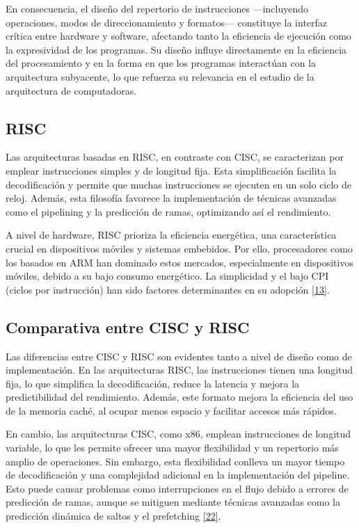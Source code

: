 \documentclass[12pt,oneside]{templates/unerthesis}
\begin{document}
En consecuencia, el diseño del repertorio de instrucciones ---incluyendo operaciones, modos de direccionamiento y formatos--- constituye la interfaz crítica entre hardware y software, afectando tanto la eficiencia de ejecución como la expresividad de los programas. Su diseño influye directamente en la eficiencia del procesamiento y en la forma en que los programas interactúan con la arquitectura subyacente, lo que refuerza su relevancia en el estudio de la arquitectura de computadoras.

\hypertarget{RISC}{%
\subsection{RISC}\label{RISC}}

Las arquitecturas basadas en RISC, en contraste con CISC, se caracterizan por emplear instrucciones simples y de longitud fija. Esta simplificación facilita la decodificación y permite que muchas instrucciones se ejecuten en un solo ciclo de reloj. Además, esta filosofía favorece la implementación de técnicas avanzadas como el pipelining y la predicción de ramas, optimizando así el rendimiento.

A nivel de hardware, RISC prioriza la eficiencia energética, una característica crucial en dispositivos móviles y sistemas embebidos. Por ello, procesadores como los basados en ARM han dominado estos mercados, especialmente en dispositivos móviles, debido a su bajo consumo energético. La simplicidad y el bajo CPI (ciclos por instrucción) han sido factores determinantes en su adopción \protect\hyperlink{ref-hennessy2017computer}{{[}13{]}}.

\hypertarget{comparativa-entre-cisc-y-risc}{%
\subsection{Comparativa entre CISC y RISC}\label{comparativa-entre-cisc-y-risc}}

Las diferencias entre CISC y RISC son evidentes tanto a nivel de diseño como de implementación. En las arquitecturas RISC, las instrucciones tienen una longitud fija, lo que simplifica la decodificación, reduce la latencia y mejora la predictibilidad del rendimiento. Además, este formato mejora la eficiencia del uso de la memoria caché, al ocupar menos espacio y facilitar accesos más rápidos.

En cambio, las arquitecturas CISC, como x86, emplean instrucciones de longitud variable, lo que les permite ofrecer una mayor flexibilidad y un repertorio más amplio de operaciones. Sin embargo, esta flexibilidad conlleva un mayor tiempo de decodificación y una complejidad adicional en la implementación del pipeline. Esto puede causar problemas como interrupciones en el flujo debido a errores de predicción de ramas, aunque se mitiguen mediante técnicas avanzadas como la predicción dinámica de saltos y el prefetching \protect\hyperlink{ref-tanenbaum_structured_2016}{{[}22{]}}.
\end{document}
